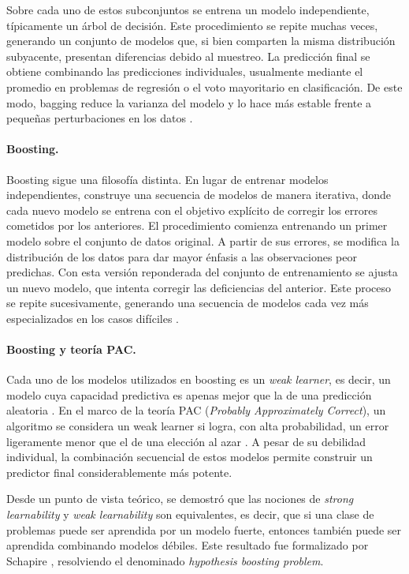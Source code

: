 Sobre cada uno de estos subconjuntos se entrena un modelo independiente, típicamente un árbol de decisión. Este procedimiento se repite muchas veces, generando un conjunto de modelos que, si bien comparten la misma distribución subyacente, presentan diferencias debido al muestreo. La predicción final se obtiene combinando las predicciones individuales, usualmente mediante el promedio en problemas de regresión o el voto mayoritario en clasificación. De este modo, bagging reduce la varianza del modelo y lo hace más estable frente a pequeñas perturbaciones en los datos \cite{breiman1996bagging, hastie2009elements}.
\paragraph{Boosting.}
Boosting sigue una filosofía distinta. En lugar de entrenar modelos independientes, construye una secuencia de modelos de manera iterativa, donde cada nuevo modelo se entrena con el objetivo explícito de corregir los errores cometidos por los anteriores. El procedimiento comienza entrenando un primer modelo sobre el conjunto de datos original. A partir de sus errores, se modifica la distribución de los datos para dar mayor énfasis a las observaciones peor predichas. Con esta versión reponderada del conjunto de entrenamiento se ajusta un nuevo modelo, que intenta corregir las deficiencias del anterior. Este proceso se repite sucesivamente, generando una secuencia de modelos cada vez más especializados en los casos difíciles \cite{schapire1990strength}.

\paragraph{Boosting y teoría PAC.}
Cada uno de los modelos utilizados en boosting es un \textit{weak learner}, es decir, un modelo cuya capacidad predictiva es apenas mejor que la de una predicción aleatoria \cite{kearns1994cryptographic}. En el marco de la teoría PAC (\textit{Probably Approximately Correct}), un algoritmo se considera un weak learner si logra, con alta probabilidad, un error ligeramente menor que el de una elección al azar \cite{valiant1984theory}. A pesar de su debilidad individual, la combinación secuencial de estos modelos permite construir un predictor final considerablemente más potente.

Desde un punto de vista teórico, se demostró que las nociones de
\textit{strong learnability} y \textit{weak learnability} son equivalentes,
es decir, que si una clase de problemas puede ser aprendida por un modelo
fuerte, entonces también puede ser aprendida combinando modelos débiles.
Este resultado fue formalizado por Schapire \cite{schapire1990strength},
resolviendo el denominado \textit{hypothesis boosting problem}.

